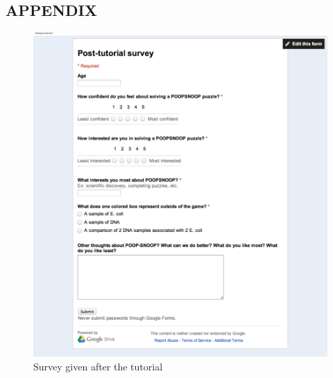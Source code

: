 \documentclass[12pt]{ucthesis}
\begin{document}
\pagestyle{plain}

\renewcommand{\baselinestretch}{1.66}












\clearpage
\nocite{*}
%


\begin{appendices}

\chapter*{APPENDIX}


{
   \captionsetup[figure]{labelformat=empty}

   \begin{figure}[H]
   \centering
   \includegraphics[width=115mm]{images/Post-tutorial.pdf}
   \caption{Survey given after the tutorial}
   \end{figure}

}
\end{appendices}
\end{document}
